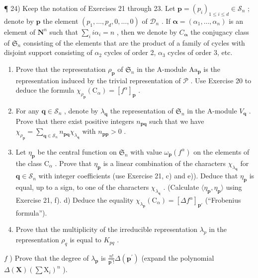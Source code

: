 ¶ 24) Keep the notation of Exercises 21 through 23. Let \(\mathbf{p} = (p_i)_{1 \leqslant i \leqslant d} \in \mathcal{S}_n\) ; denote by \(\mathbf{p}\) the element \((p_1, \ldots, p_d, 0, \ldots, 0)\) of \(\mathcal{D}_n\) . If \(\boldsymbol{\alpha} = (\alpha_1, \ldots, \alpha_n)\) is an element of \(\mathbf{N}^n\) such that \(\sum_i i\alpha_i = n\) , then we denote by \(C_{\boldsymbol{\alpha}}\) the conjugacy class of \(\mathfrak{S}_n\) consisting of the elements that are the product of a family of cycles with disjoint support consisting of \(\alpha_2\) cycles of order 2, \(\alpha_3\) cycles of order 3, etc.

\begin{enumerate}
\def\labelenumi{\alph{enumi})}
\item
  Prove that the representation \(\rho_{\mathbf{p}}\) of \(\mathfrak{S}_n\) in the A-module \(\mathrm{Aa}_{\mathbf{p}}\) is the representation induced by the trivial representation of \(\mathcal{P}\) . Use Exercise 20 to deduce the formula \(\chi_{\rho_{\mathbf{p}}}(\mathrm{C}_{\alpha}) = [f^{\alpha}]_{\mathbf{p}}\) .
\item
  For any \(\mathbf{q} \in \mathcal{S}_n\) , denote by \(\lambda_{\mathbf{q}}\) the representation of \(\mathfrak{S}_n\) in the A-module \(V_{\mathbf{q}}\) . Prove that there exist positive integers \(n_{\mathbf{pq}}\) such that we have \(\chi_{\rho_{\mathbf{p}}} = \sum_{\mathbf{q} \in \mathcal{S}_n} n_{\mathbf{pq}} \chi_{\lambda_{\mathbf{q}}}\) with \(n_{\mathbf{pp}} > 0\) .
\item
  Let \(\eta_{\mathbf{p}}\) be the central function on \(\mathfrak{S}_n\) with value \(\omega_{\mathbf{p}}(f^{\alpha})\) on the elements of the class \(\mathrm{C}_{\alpha}\) . Prove that \(\eta_{\mathbf{p}}\) is a linear combination of the characters \(\chi_{\lambda_{\mathbf{q}}}\) for \(\mathbf{q} \in \mathcal{S}_n\) with integer coefficients (use Exercise 21, c) and e)). Deduce that \(\eta_{\mathbf{p}}\) is equal, up to a sign, to one of the characters \(\chi_{\lambda_{\mathbf{q}}}\) . (Calculate \(\langle \eta_{\mathbf{p}}, \eta_{\mathbf{p}} \rangle\) using Exercise 21, f). d) Deduce the equality \(\chi_{\lambda_{\mathbf{p}}}(\mathrm{C}_{\alpha}) = [\Delta f^{\alpha}]_{\mathbf{p}'}\) (``Frobenius formula'').
\item
  Prove that the multiplicity of the irreducible representation \(\lambda_{p}\) in the representation \(\rho_{q}\) is equal to \(K_{pq}\) .
\end{enumerate}

\(f\) ) Prove that the degree of \(\lambda_{\mathbf{p}}\) is \(\frac{n!}{\mathbf{p}^{\prime}!}\Delta (\mathbf{p}^{\prime})\) (expand the polynomial \(\Delta (\mathbf{X})(\sum \mathrm{X}_i)^n\) ).

